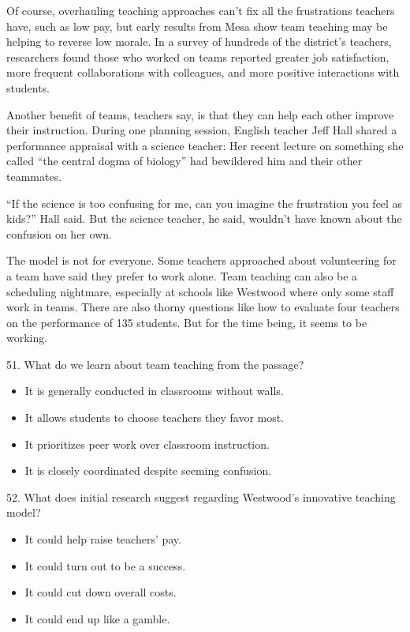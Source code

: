 \documentclass[UTF8,11pt]{ctexart}
\begin{document}
Of course, overhauling teaching approaches can’t fix all the frustrations teachers have, such as low pay, but early results from Mesa show team teaching may be helping to reverse low morale. In a survey of hundreds of the district’s teachers, researchers found those who worked on teams reported greater job satisfaction, more frequent collaborations with colleagues, and more positive interactions with students.


Another benefit of teams, teachers say, is that they can help each other improve their instruction. During one planning session, English teacher Jeff Hall shared a performance appraisal with a science teacher: Her recent lecture on something she called “the central dogma of biology” had bewildered him and their other teammates.


“If the science is too confusing for me, can you imagine the frustration you feel as kids?” Hall said. But the science teacher, he said, wouldn’t have known about the confusion on her own.


The model is not for everyone. Some teachers approached about volunteering for a team have said they prefer to work alone. Team teaching can also be a scheduling nightmare, especially at schools like Westwood where only some staff work in teams. There are also thorny questions like how to evaluate four teachers on the performance of 135 students. But for the time being, it seems to be working.


51. What do we learn about team teaching from the passage?


\begin{itemize}[leftmargin=2em,itemsep=.2em,topsep=.4em]\item[A.] It is generally conducted in classrooms without walls.
\item[B.] It allows students to choose teachers they favor most.
\item[C.] It prioritizes peer work over classroom instruction.
\item[D.] It is closely coordinated despite seeming confusion.
\end{itemize}

52. What does initial research suggest regarding Westwood’s innovative teaching model?


\begin{itemize}[leftmargin=2em,itemsep=.2em,topsep=.4em]\item[A.] It could help raise teachers’ pay.
\item[B.] It could turn out to be a success.
\item[C.] It could cut down overall costs.
\item[D.] It could end up like a gamble.
\end{itemize}
\end{document}
